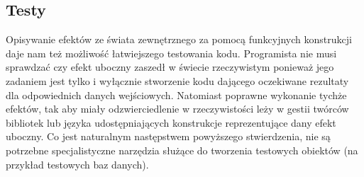 \documentclass[../main.tex]{subfiles}
\begin{document}
\subsection{Testy}
Opisywanie efektów ze świata zewnętrznego za pomocą funkcyjnych konstrukcji daje nam też możliwość łatwiejszego testowania kodu. Programista nie musi sprawdzać czy efekt uboczny zaszedł w świecie rzeczywistym ponieważ jego zadaniem jest tylko i wyłącznie stworzenie kodu dającego oczekiwane rezultaty dla odpowiednich danych wejściowych. Natomiast poprawne wykonanie tychże efektów, tak aby miały odzwierciedlenie w rzeczywistości leży w gestii twórców bibliotek lub języka udostępniających konstrukcje reprezentujące dany efekt uboczny. Co jest naturalnym następstwem powyższego stwierdzenia, nie są potrzebne specjalistyczne narzędzia służące do tworzenia testowych obiektów (na przykład testowych baz danych).
\end{document}
